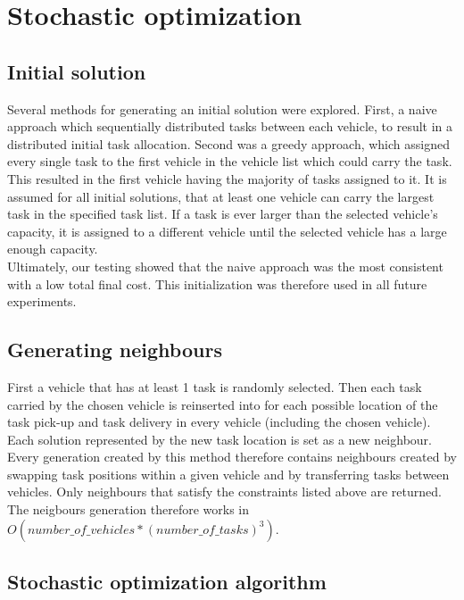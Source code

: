 \documentclass[11pt]{article}
\begin{document}
\section{Stochastic optimization}

\subsection{Initial solution}
Several methods for generating an initial solution were explored. First, a naive approach which sequentially distributed tasks between each vehicle, to result in a distributed initial task allocation. Second was a greedy approach, which assigned every single task to the first vehicle in the vehicle list which could carry the task. This resulted in the first vehicle having the majority of tasks assigned to it. It is assumed for all initial solutions, that at least one vehicle can carry the largest task in the specified task list. If a task is ever larger than the selected vehicle's capacity, it is assigned to a different vehicle until the selected vehicle has a large enough capacity.\\

Ultimately, our testing showed that the naive approach was the most consistent with a low total final cost. This initialization was therefore used in all future experiments. 

\subsection{Generating neighbours}
First a vehicle that has at least 1 task is randomly selected. Then each task carried by the chosen vehicle is reinserted into for each possible location of the task pick-up and task delivery in every vehicle (including the chosen vehicle). Each solution represented by the new task location is set as a new neighbour. Every generation created by this method therefore contains neighbours created by swapping task positions within a given vehicle and by transferring tasks between vehicles. Only neighbours that satisfy the constraints listed above are returned. The neigbours generation therefore works in $O(number\_of\_vehicles * (number\_of\_tasks)^3)$.

\subsection{Stochastic optimization algorithm}
\end{document}
